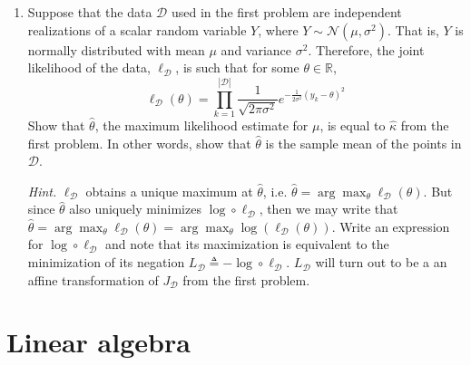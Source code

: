 \documentclass{article}
\numberwithin{equation}{section}
\begin{document}
\begin{enumerate}
    \item
    Suppose that the data $ \mathcal{D} $ used in the first problem are
    independent realizations of a scalar random variable $ Y $, where
    $ Y \sim \mathcal{N}(\mu, \sigma^2) $. That is, $ Y $ is normally
    distributed with mean $ \mu $ and variance $ \sigma^2 $. Therefore, the
    joint likelihood of the data, $ \ell_\mathcal{D} $, is such that for some
    $ \theta \in \mathbb{R} $,
    \begin{equation*}
        \ell_\mathcal{D}(\theta) = \prod_{k = 1}^{|\mathcal{D}|}
        \frac{1}{\sqrt{2\pi\sigma^2}}e^{-\frac{1}{2\sigma^2}(y_k - \theta)^2}
    \end{equation*}
    Show that $ \hat{\theta} $, the maximum likelihood estimate for $ \mu $, is
    equal to $ \hat{\kappa} $ from the first problem. In other words, show that
    $ \hat{\theta} $ is the sample mean of the points in $ \mathcal{D} $.

    \medskip

    \textit{Hint.} $ \ell_\mathcal{D} $ obtains a unique maximum at
    $ \hat{\theta} $, i.e. $ \hat{\theta} = \arg\max_\theta
    \ell_\mathcal{D}(\theta) $. But since $ \hat{\theta} $ also uniquely
    minimizes $ \log \circ \ell_\mathcal{D} $, then we may write
    that\footnotemark{} $ \hat{\theta} = \arg\max_\theta\ell_\mathcal{D}(\theta) =
    \arg\max_\theta\log(\ell_\mathcal{D}(\theta)) $. Write an expression for
    $ \log\circ\ell_\mathcal{D} $ and note that its maximization is equivalent
    to the minimization of its negation $ L_\mathcal{D} \triangleq
    -\log\circ\ell_\mathcal{D} $. $ L_\mathcal{D} $ will turn out to be a an
    affine transformation of $ J_\mathcal{D} $ from the first problem.
\end{enumerate}

\section{Linear algebra}
\end{document}
